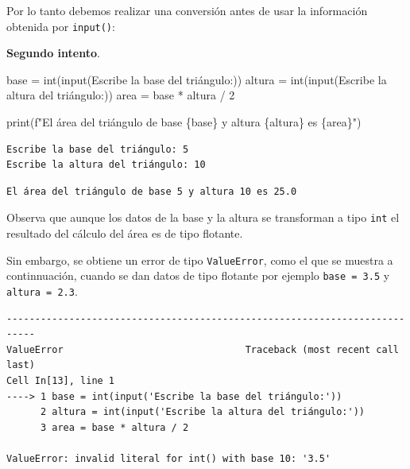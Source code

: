 \documentclass[
  spanish,
  letterpaper,
]{scrbook}
\newenvironment{Shaded}{\begin{snugshade}}{\end{snugshade}}
\newcommand{\BuiltInTok}[1]{\textcolor[rgb]{0.00,0.23,0.31}{#1}}
\newcommand{\DecValTok}[1]{\textcolor[rgb]{0.68,0.00,0.00}{#1}}
\newcommand{\NormalTok}[1]{\textcolor[rgb]{0.00,0.23,0.31}{#1}}
\newcommand{\OperatorTok}[1]{\textcolor[rgb]{0.37,0.37,0.37}{#1}}
\newcommand{\SpecialCharTok}[1]{\textcolor[rgb]{0.37,0.37,0.37}{#1}}
\newcommand{\SpecialStringTok}[1]{\textcolor[rgb]{0.13,0.47,0.30}{#1}}
\newcommand{\StringTok}[1]{\textcolor[rgb]{0.13,0.47,0.30}{#1}}
\theoremstyle{definition}
\theoremstyle{remark}
\begin{document}
Por lo tanto debemos realizar una conversión antes de usar la
información obtenida por \texttt{input()}:

\textbf{Segundo intento}.

\begin{Shaded}
\begin{Highlighting}[]
\NormalTok{base }\OperatorTok{=} \BuiltInTok{int}\NormalTok{(}\BuiltInTok{input}\NormalTok{(}\StringTok{\textquotesingle{}Escribe la base del triángulo:\textquotesingle{}}\NormalTok{))}
\NormalTok{altura }\OperatorTok{=} \BuiltInTok{int}\NormalTok{(}\BuiltInTok{input}\NormalTok{(}\StringTok{\textquotesingle{}Escribe la altura del triángulo:\textquotesingle{}}\NormalTok{))}
\NormalTok{area }\OperatorTok{=}\NormalTok{ base }\OperatorTok{*}\NormalTok{ altura }\OperatorTok{/} \DecValTok{2}

\BuiltInTok{print}\NormalTok{(}\SpecialStringTok{f"El área del triángulo de base }\SpecialCharTok{\{}\NormalTok{base}\SpecialCharTok{\}}\SpecialStringTok{ y altura }\SpecialCharTok{\{}\NormalTok{altura}\SpecialCharTok{\}}\SpecialStringTok{ es }\SpecialCharTok{\{}\NormalTok{area}\SpecialCharTok{\}}\SpecialStringTok{"}\NormalTok{)}
\end{Highlighting}
\end{Shaded}

\begin{verbatim}
Escribe la base del triángulo: 5
Escribe la altura del triángulo: 10
\end{verbatim}

\begin{verbatim}
El área del triángulo de base 5 y altura 10 es 25.0
\end{verbatim}

Observa que aunque los datos de la base y la altura se transforman a
tipo \texttt{int} el resultado del cálculo del área es de tipo flotante.

Sin embargo, se obtiene un error de tipo \texttt{ValueError}, como el
que se muestra a continnuación, cuando se dan datos de tipo flotante por
ejemplo \texttt{base\ =\ 3.5} y \texttt{altura\ =\ 2.3}.

\begin{verbatim}
---------------------------------------------------------------------------
ValueError                                Traceback (most recent call last)
Cell In[13], line 1
----> 1 base = int(input('Escribe la base del triángulo:'))
      2 altura = int(input('Escribe la altura del triángulo:'))
      3 area = base * altura / 2

ValueError: invalid literal for int() with base 10: '3.5'
\end{verbatim}
\end{document}
